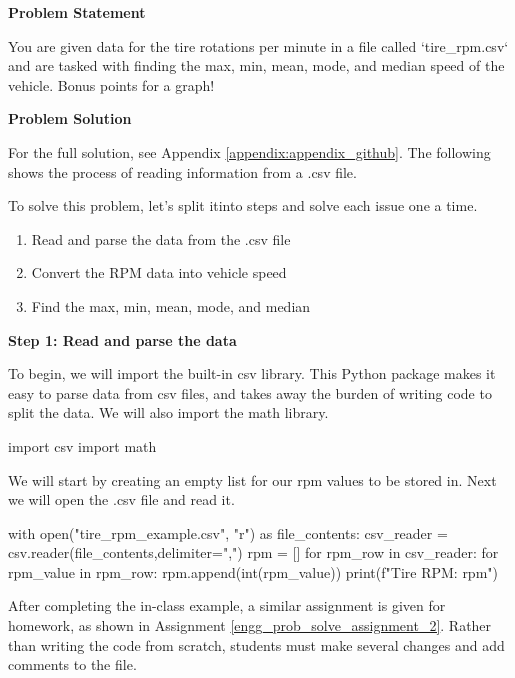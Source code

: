 \begin{tcolorbox}[breakable, enhanced jigsaw, title=DEN 161: Assignment \ref{engg_prob_solve_assignment_1}, 
    colframe=ksu-purple, colback=ksu-gray]

    \textbf{Problem Statement}

    You are given data for the tire rotations per minute in a file called `tire\_rpm.csv` and are tasked with 
    finding the max, min, mean, mode, and median speed of the vehicle. Bonus points for a graph!

    \tcblower
    \textbf{Problem Solution}

    For the full solution, see Appendix \ref{appendix:appendix_github}. The following shows the process
    of reading information from a .csv file.
    
    To solve this problem, let's split itinto steps and solve each issue one a time.

    \begin{enumerate}
        \item Read and parse the data from the .csv file
        \item Convert the RPM data into vehicle speed 
        \item Find the max, min, mean, mode, and median
    \end{enumerate}
    
    \textbf{Step 1: Read and parse the data}
    
    To begin, we will import the built-in csv library. This Python package makes it easy to parse data from csv 
    files, and takes away the burden of writing code to split the data. We will also import the math library.

\begin{python}
import csv
import math
\end{python}

    We will start by creating an empty list for our rpm values to be stored in. Next we will open the .csv 
    file and read it.

\begin{python}
with open("tire_rpm_example.csv", "r") as file_contents:
csv_reader = csv.reader(file_contents,delimiter=",")
rpm = []
for rpm_row in csv_reader:
    for rpm_value in rpm_row:
        rpm.append(int(rpm_value))
print(f"Tire RPM: {rpm}")
\end{python}
\end{tcolorbox}

After completing the in-class example, a similar assignment is given for homework, as shown in Assignment
\ref{engg_prob_solve_assignment_2}. Rather than writing the code from scratch, students must make several 
changes and add comments to the file.

